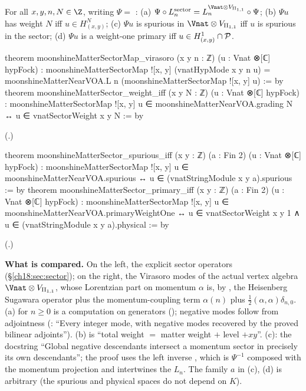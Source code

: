 \begin{theorem}\label{ch18:thm:sectorcomparison}
For all $x,y,n,N\in\Z$, writing $\Psi=$ :
(a) $\Psi\circ L_n^{\text{sector}}=L_n^{\Vnat\otimes V_{\chXVIIIII}}\circ\Psi$;
(b) $\Psi u$ has weight $N$ iff $u\in H^N_{(x,y)}$;
(c) $\Psi u$ is spurious in $\Vnat\otimes V_{\chXVIIIII}$ iff $u$ is spurious in the sector;
(d) $\Psi u$ is a weight-one primary iff $u\in H^1_{(x,y)}\cap\mathcal{P}$.
\end{theorem}
\begin{leancode}
theorem moonshineMatterSectorMap_virasoro (x y n : ℤ) (u : Vnat ⊗[ℂ] hypFock) :
    moonshineMatterSectorMap ![x, y] (vnatHypMode x y n u) =
      moonshineMatterNearVOA.L n (moonshineMatterSectorMap ![x, y] u) := by
theorem moonshineMatterSector_weight_iff (x y N : ℤ) (u : Vnat ⊗[ℂ] hypFock) :
    moonshineMatterSectorMap ![x, y] u ∈ moonshineMatterNearVOA.grading N ↔
      u ∈ vnatSectorWeight x y N := by
\end{leancode}
(.)
\begin{leancode}
theorem moonshineMatterSector_spurious_iff (x y : ℤ) (a : Fin 2)
    (u : Vnat ⊗[ℂ] hypFock) :
    moonshineMatterSectorMap ![x, y] u ∈ moonshineMatterNearVOA.spurious ↔
      u ∈ (vnatStringModule x y a).spurious := by
theorem moonshineMatterSector_primary_iff (x y : ℤ) (a : Fin 2)
    (u : Vnat ⊗[ℂ] hypFock) :
    moonshineMatterSectorMap ![x, y] u ∈ moonshineMatterNearVOA.primaryWeightOne ↔
      u ∈ vnatSectorWeight x y 1 ∧ u ∈ (vnatStringModule x y a).physical := by
\end{leancode}
(.)
\begin{dictionary}
\textbf{What is compared.}  On the left, the explicit sector operators (\S\ref{ch18:sec:sector}); on the
right, the Virasoro modes of the actual vertex algebra $\Vnat\otimes V_{\chXVIIIII}$, whose Lorentzian part on
momentum $\alpha$ is, by , the Heisenberg Sugawara operator plus the
momentum-coupling term $\alpha(n)$ plus $\frac12(\alpha,\alpha)\delta_{n,0}$.  (a) for $n\ge0$ is a computation on generators
(); negative modes follow from adjointness
(: ``Every integer mode, with negative modes recovered by the proved
bilinear adjoints'').  (b) is ``total weight $=$ matter weight $+$ level $+xy$''.  (c): the docstring
``Global negative descendants intersect a momentum sector in precisely its own descendants''; the proof uses
the left inverse , which is $\Psi^{-1}$ composed with the momentum projection
and intertwines the $L_n$.  The family $a$ in (c), (d) is arbitrary (the spurious and physical spaces do
not depend on $K$).
\end{dictionary}
